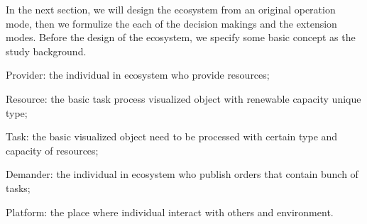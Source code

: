 In the next section, we will design the ecosystem from an original operation mode, then we formulize the each of the decision makings and the extension modes. Before the design of the ecosystem, we specify some basic concept as the study background. 
\begin{compactitem}
	\item Provider: the individual in ecosystem who provide resources;
	\item Resource: the basic task process visualized object with renewable capacity unique type;
	\item Task: the basic visualized object need to be processed with certain type and capacity of resources;
	\item Demander: the individual in ecosystem who publish orders that contain bunch of tasks;
	\item Platform: the place where individual interact with others and environment.
\end{compactitem}
